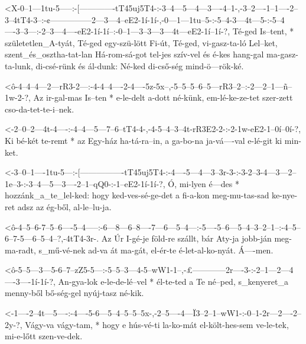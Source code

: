   {<X-0--1---1tu-5-----:-[-------------tT45uj5T4-:-3--4---5---4---3----4--1-,-3--2----1--1----2--3--4tT4-3--:-¢---------------2---3---4--eE2-1í-1í-,-0---1---1tu--5-:-5--4-3---4t---5-:-5--4----3--3---:-2--3---4----eE2-1í-1í--:-0--1---3--3---3---4t---eE2-1í--1í-?,}
  {   Té-ged Is--tent, * születetlen_A-tyát,       Té-ged egy-szü-lött Fi-út, Té-ged, vi-gasz-ta-ló Lel--ket, szent_és_osztha-tat-lan Há-rom-sá-got  tel-jes szív-vel és é-kes hang-gal ma-gasz-ta-lunk, di-csé-rünk és  ál-dunk: Né-ked di-cső-ség mind-ö---rök-ké.}



  {<ô-4--4--4---2---rR3-2---:-4-4--4----2-4----5z-5x--,-5--5--5--6--5---rR3--2--:-2---2--1---ñ--1w-2-?,}
  {   Az ir-gal-mas Is--ten * e-le-delt a-dott né-künk, em-lé-ke-ze-tet szer-zett cso-da-tet-te-i--nek.}

  {<-2--0--2---4t-4----:-4--4---5---7--6--tT4-4-,-4-5--4--3--4t-rR3E2-2-:-2-1w-eE2-1--0í--0í-?,}
  {  Ki bé-két te-remt * az Egy-ház ha-tá-ra--in, a ga-bo-na ja-vá----val e-lé-git ki min-ket.}

  {<-3--0--1----1tu-5---:-[----------------tT45uj5T4-:-4----5---4---3--3r-3-:-3-2--3-4---3---2--1e--3-:-3--4---5---3----2--1--qQ0-:-1--eE2-1í-1í-?,}
  {  Ó, mi-lyen é---des * hozzánk_a_te_lel-ked:        hogy ked-ves-sé-ge-det a fi-a-kon meg-mu-tas-sad ke-nye-ret adsz az ég-ből,  al-le--lu-ja.}


  {<ô-4--5--6-7--5--6----5--4-----:-6---8---6--8----7---6---5--4---:-5----5--6---5--4--3--2--1--:-4--5--6--7-5---6--5--4--?,-4tT4-3r-.}
  {   Az Úr I-gé-je föld-re szállt, bár Aty-ja jobb-ján meg-ma-radt, s_mű-vé-nek ad-va át ma-gát, el-ér-te é-let-al-ko-nyát. Á----men.}

  {<ô-5--5---3---5-6--7--zZ5-5---:-5--5--3---4-5--wW1-1--,-£------------2r----3-:-2--1---2---4----3----1í-1í-?,}
  {   An-gya-lok e-le-de-lé--vel * él-te-ted a Te né--ped, s_kenyeret_a menny-ből bő-ség-gel nyúj-tasz né-kik.}


  {<-1----2--4t---5----:-4----5-6---5--4--5--5--5x-,-2--5----4---Ï3--2--1--wW1-:-0--1-2r---2----2--2y-?,}
  {  Vágy-va vágy-tam, * hogy e hús-vé-ti la-ko-mát  el-költ-hes-sem ve-le-tek,  mi-e-lőtt szen-ve-dek.}

